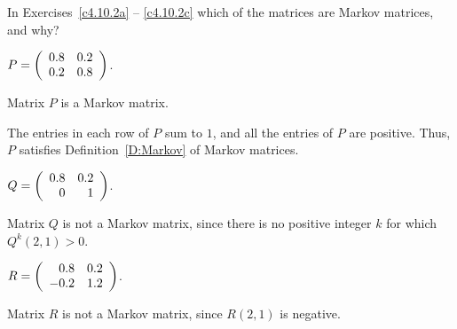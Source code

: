 \documentclass{ximera}
\begin{document}
\noindent In Exercises~\ref{c4.10.2a} -- \ref{c4.10.2c} which of the
matrices are Markov matrices, and why?
\begin{exercise} \label{c4.10.2a}
$P = \left(\begin{array}{rr} 0.8 & 0.2\\ 0.2 &0.8\end{array}\right)$.

\begin{solution}
\ans Matrix $P$ is a Markov matrix.

\soln The entries in each row of $P$ sum to $1$, and all the entries of
$P$ are positive.  Thus, $P$ satisfies Definition~\ref{D:Markov} of Markov
matrices.

\end{solution}
\end{exercise}
\begin{exercise} \label{c4.10.2b}
$Q = \left(\begin{array}{rr} 0.8 & 0.2\\ 0 &1\end{array}\right)$.

\begin{solution}
Matrix $Q$ is not a Markov matrix, since there is no
positive integer $k$ for which $Q^k(2,1) > 0$.

\end{solution}
\end{exercise}
\begin{exercise} \label{c4.10.2c}
$R = \left(\begin{array}{rr} 0.8 & 0.2\\ -0.2 &1.2\end{array}\right)$.

\begin{solution}
Matrix $R$ is not a Markov matrix, since $R(2,1)$ is
negative.

\end{solution}
\end{exercise}
\end{document}
